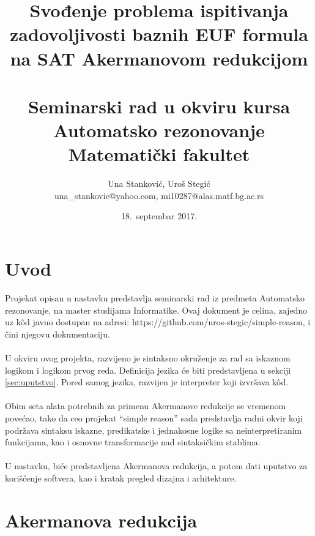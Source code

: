 \documentclass[a4paper]{article}
\begin{document}
\title{Svođenje problema ispitivanja zadovoljivosti baznih EUF formula na SAT Akermanovom redukcijom \\ \small{~\\Seminarski rad u okviru kursa\\Automatsko rezonovanje\\ Matematički fakultet}}

\author{
	Una Stanković, Uroš Stegić\\
	una\_stankovic@yahoo.com, mi10287@alas.matf.bg.ac.rs}
\date{18.~septembar 2017.}
\maketitle


\tableofcontents

\newpage


\section{Uvod}
\label{sec:uvod}

Projekat opisan u nastavku predstavlja seminarski rad iz predmeta Automatsko rezonovanje, na master studijama Informatike. Ovaj dokument je celina, zajedno uz k\^od javno dostupan na adresi: https://github.com/uros-stegic/simple-reason, i čini njegovu dokumentaciju.\\\\ 

U okviru ovog projekta, razvijeno je sintaksno okruženje za rad sa iskaznom logikom i logikom prvog reda. Definicija jezika će biti predstavljena u sekciji \ref{sec:uputstvo}. Pored samog jezika, razvijen je interpreter koji izvršava k\^od.\\\\ Obim seta alata potrebnih za primenu Akermanove redukcije se vremenom povećao, tako da ceo projekat ``simple reason'' sada predstavlja radni okvir koji podržava sintaksu iskazne, predikatske i jednakosne logike sa neinterpretiranim funkcijama, kao i osnovne transformacije nad sintaksičkim stablima.\\\\

U nastavku, biće predstavljena Akermanova redukcija, a potom dati uputstvo za korišćenje softvera, kao i kratak pregled dizajna i arhitekture.


\section{Akermanova redukcija}
\end{document}
